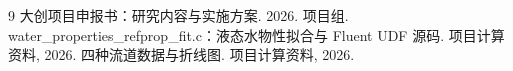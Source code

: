 \documentclass[stage2,fontset=fandol]{ydzjreport}
\begin{document}
\FloatBarrier
{}
\begin{thebibliography}{9}
 大创项目申报书：研究内容与实施方案. 2026.
 项目组. water\_properties\_refprop\_fit.c：液态水物性拟合与 Fluent UDF 源码. 项目计算资料, 2026.
 四种流道数据与折线图. 项目计算资料, 2026.
\end{thebibliography}
\end{document}
